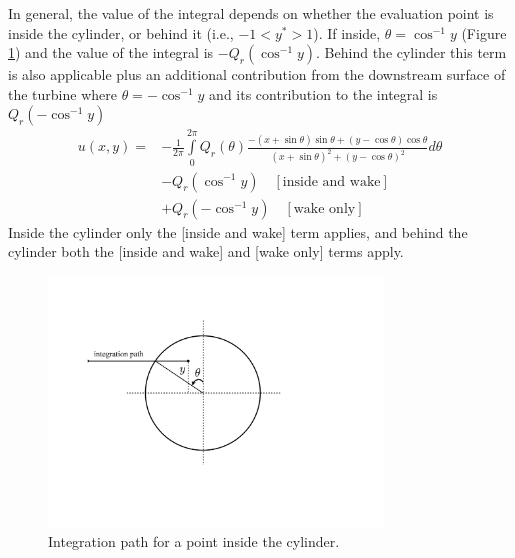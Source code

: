 \documentclass{article}
\begin{document}
In general, the value of the integral depends on whether the evaluation point is inside the cylinder, or behind it (i.e., $-1 < y^* >1 $).  If inside, $\theta = \cos^{-1} y$ (Figure \ref{fig:integration}) and the value of the integral is $-Q_r(\cos^{-1}y)$.  Behind the cylinder this term is also applicable plus an additional contribution from the downstream surface of the turbine where $\theta = -\cos^{-1} y$ and its contribution to the integral is $Q_r(-\cos^{-1}y) $
\begin{equation}
\begin{aligned}
u(x, y) =& -\frac{1}{2\pi}\int\limits_0^{2\pi} Q_r(\theta) \frac{-(x+\sin\theta)\sin\theta + (y-\cos\theta)\cos\theta}{(x+\sin\theta)^2 + (y-\cos\theta)^2} d\theta  \\
&- Q_r(\cos^{-1}y) \quad [\textrm{inside and wake}] \\
&+ Q_r(-\cos^{-1}y) \quad [\textrm{wake only}]
\label{eq:u}
\end{aligned}
\end{equation}
Inside the cylinder only the [inside and wake] term applies, and behind the cylinder both the [inside and wake] and [wake only] terms apply.

\begin{figure}[htbp]
\begin{center}
\includegraphics[width=3.5in]{images/integration}
\caption{Integration path for a point inside the cylinder.}
\label{fig:integration}
\end{center}
\end{figure}
\end{document}
